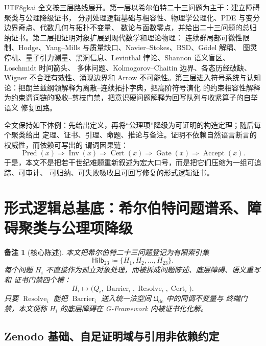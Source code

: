 \documentclass[12pt]{article}
\newtheorem{remark}{备注}[section]
\newcommand{\GFramework}{\textsf{G-Framework}}
\newcommand{\Udc}{\mathfrak{U}_{\mathrm{dc}}}
\newcommand{\Hilb}{\mathsf{Hilb}_{23}}
\newcommand{\DefEq}{\coloneqq}
\DeclareMathOperator{\Pred}{Pred}
\DeclareMathOperator{\Cert}{Cert}
\DeclareMathOperator{\Accept}{Accept}
\DeclareMathOperator{\Resolve}{Resolve}
\DeclareMathOperator{\Barrier}{Barrier}
\DeclareMathOperator{\Gate}{Gate}
\DeclareMathOperator{\Inv}{Inv}
\begin{document}
\begin{CJK*}{UTF8}{gkai}
全文按三层路线展开。第一层以希尔伯特二十三问题为主干：建立障碍聚类与公理降级证书，
分别处理逻辑基础与相容性、物理学公理化、PDE 与变分边界奇点、代数几何与拓扑不变量、
数论与函数零点，并给出二十三问题的总归纳证书。第二层把证明对象扩展到现代数学和理论物理：
连续群局部可微性限制、Hodge、Yang--Mills 与质量缺口、Navier--Stokes、BSD、Gödel 解耦、
图灵停机、量子引力测量、黑洞信息、Levinthal 悖论、Shannon 语义盲区、Loschmidt 时间箭头、
多体问题、Kolmogorov--Chaitin 边界、各态历经破缺、Wigner 不合理有效性、涌现边界和
Arrow 不可能性。第三层进入符号系统与认知论：把朗兰兹纲领解释为离散--连续拓扑字典，把高阶符号演化
的约束相容性解释为约束谓词链的吸收--剪枝门禁，把意识硬问题解释为回写队列与收紧算子的自举语义
修复回路。

全文保持如下体例：先给出定义，再将“公理项”降级为可证明的构造定理；随后每个聚类给出
定理、证书、引理、命题、推论与备注。证明不依赖自然语言断言的权威性，而依赖可写出的
谓词因果链：
\[
  \Pred(x)
  \Longrightarrow
  \Inv(x)
  \Longrightarrow
  \Cert(x)
  \Longrightarrow
  \Gate(x)
  \Longrightarrow
  \Accept(x).
\]
于是，本文不是把若干世纪难题重新叙述为宏大口号，而是把它们压缩为一组可追踪、可审计、
可归纳、可失败吸收且可回写修复的形式逻辑证书。

\setcounter{tocdepth}{3}
\setcounter{secnumdepth}{3}
\tableofcontents
\clearpage

\section{形式逻辑总基底：希尔伯特问题谱系、障碍聚类与公理项降级}
\label{sec:tex59-base}

\begin{remark}[核心陈述]
本文把希尔伯特二十三问题登记为有限索引集
\[
  \Hilb \DefEq \{H_1,H_2,\ldots,H_{23}\}.
\]
每个问题 \(H_i\) 不直接作为孤立对象处理，而被拆成问题陈述、底层障碍、语义重写和
证书门禁四个槽：
\[
  H_i
  \longmapsto
  \bigl(Q_i,\Barrier_i,\Resolve_i,\Cert_i\bigr).
\]
只要 \(\Resolve_i\) 能把 \(\Barrier_i\) 送入统一法空间 \(\Udc\) 中的同调不变量与
终端门禁，本文便称 \(H_i\) 的底层障碍在 \GFramework{} 内被证书化化解。
\end{remark}

\subsection{Zenodo 基础、自足证明域与引用非依赖约定}
\label{subsec:tex59-puremath-self-contained}


\end{CJK*}
\end{document}
